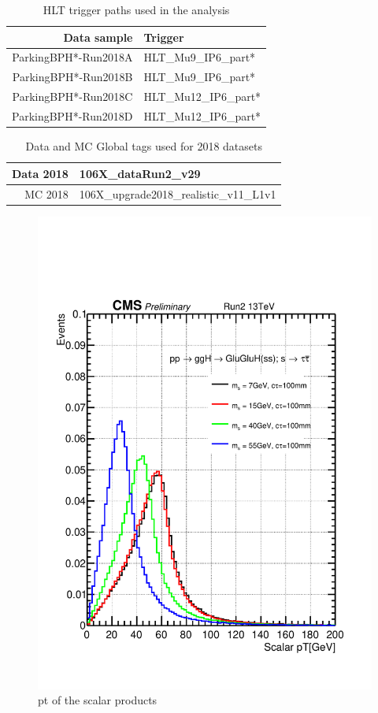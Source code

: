 \begin{table}[htb]
\caption{HLT trigger paths used in the analysis}
\begin{center}
\begin{tabular}{r|l}\hline
\hline
 Data sample & Trigger \\
\hline
 ParkingBPH*-Run2018A & HLT\_Mu9\_IP6\_part* \\
 ParkingBPH*-Run2018B & HLT\_Mu9\_IP6\_part* \\
 \hline
 ParkingBPH*-Run2018C & HLT\_Mu12\_IP6\_part* \\
 ParkingBPH*-Run2018D & HLT\_Mu12\_IP6\_part* \\
 \hline
 \hline
\end{tabular}
\label{tab:triggers18}
\end{center}
\end{table}

\begin{table}[htb]
\caption{Data and MC Global tags used for 2018 datasets}
\begin{center}
\begin{tabular}{r|l}\hline
 Data 2018 & 106X\_dataRun2\_v29 \\
 \hline
 MC 2018   & 106X\_upgrade2018\_realistic\_v11\_L1v1 \\
 \hline
\end{tabular}
\label{tab:GT}
\end{center}
\end{table}



\begin{figure}[h!]
  \caption{pt of the scalar products}
  \label{fig:scalarpt}
  \centering
  \includegraphics[width=0.5\linewidth]{figs/Scalar_pT100mm.pdf}
\end{figure}

